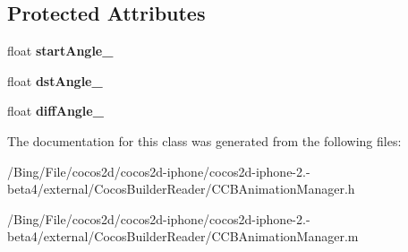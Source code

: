 \subsection*{Protected Attributes}
\begin{DoxyCompactItemize}
\item 
\hypertarget{interface_c_c_b_rotate_to_a692d998c31c3d1489bd4983d6e286c00}{float {\bfseries start\-Angle\-\_\-}}\label{interface_c_c_b_rotate_to_a692d998c31c3d1489bd4983d6e286c00}

\item 
\hypertarget{interface_c_c_b_rotate_to_a3053bdb83846419a2df5209ac61ff323}{float {\bfseries dst\-Angle\-\_\-}}\label{interface_c_c_b_rotate_to_a3053bdb83846419a2df5209ac61ff323}

\item 
\hypertarget{interface_c_c_b_rotate_to_ad47d9dc52d7564799e332c11088ccde1}{float {\bfseries diff\-Angle\-\_\-}}\label{interface_c_c_b_rotate_to_ad47d9dc52d7564799e332c11088ccde1}

\end{DoxyCompactItemize}


The documentation for this class was generated from the following files\-:\begin{DoxyCompactItemize}
\item 
/\-Bing/\-File/cocos2d/cocos2d-\/iphone/cocos2d-\/iphone-\/2.-\/beta4/external/\-Cocos\-Builder\-Reader/C\-C\-B\-Animation\-Manager.\-h\item 
/\-Bing/\-File/cocos2d/cocos2d-\/iphone/cocos2d-\/iphone-\/2.-\/beta4/external/\-Cocos\-Builder\-Reader/C\-C\-B\-Animation\-Manager.\-m\end{DoxyCompactItemize}
